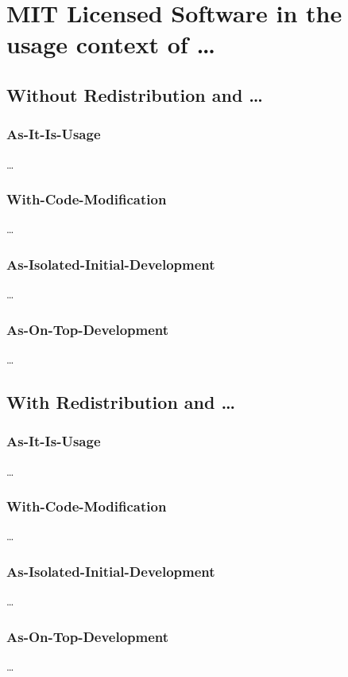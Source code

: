 %
%
%
%
%



\section{MIT Licensed Software in the usage context of \ldots}
\subsection{Without Redistribution and \ldots}
\subsubsection{As-It-Is-Usage}
\ldots
\subsubsection{With-Code-Modification}
\ldots
\subsubsection{As-Isolated-Initial-Development}
\ldots
\subsubsection{As-On-Top-Development}
\ldots

\subsection{With Redistribution and \ldots}
\subsubsection{As-It-Is-Usage}
\ldots
\subsubsection{With-Code-Modification}
\ldots
\subsubsection{As-Isolated-Initial-Development}
\ldots
\subsubsection{As-On-Top-Development}
\ldots

%
